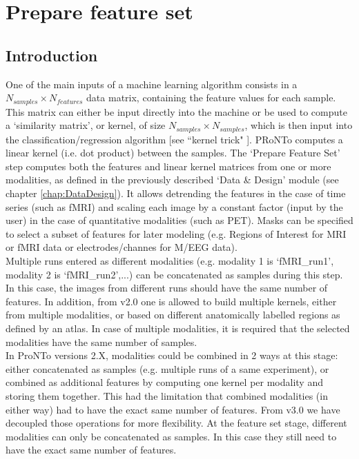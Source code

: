 %

\chapter{Prepare feature set}
\label{chap:PrepFeat}
\minitoc

\section{Introduction}
\label{sec:prep_intro}
One of the main inputs of a machine learning algorithm consists in a $N_{samples} \times N_{features}$ data matrix, containing the feature values for each sample.  This matrix can either be input directly into the machine or be used to compute a `similarity matrix', or kernel, of size $N_{samples} \times N_{samples}$, which is then input into the classification/regression algorithm [see ``kernel trick" \cite{Hofmann2008,Aizerman1964}]. PRoNTo computes a linear kernel (i.e. dot product) between the samples. The `Prepare Feature Set' step computes both the features and linear kernel matrices from one or more modalities, as defined in the previously described `Data \& Design' module (see chapter \ref{chap:DataDesign}).  It allows detrending the features in the case of time series (such as fMRI) and scaling each image by a constant factor (input by the user) in the case of quantitative modalities (such as PET). Masks can be specified to select a subset of features for later modeling (e.g. Regions of Interest for MRI or fMRI data or electrodes/channes for M/EEG data).
\\

Multiple runs entered as different modalities (e.g. modality 1 is `fMRI\_run1', modality 2 is `fMRI\_run2',...) can be concatenated as samples during this step. In this case, the images from different runs should have the same number of features. In addition, from v2.0 one is allowed to build multiple kernels, either from multiple modalities, or based on different anatomically labelled regions as defined by an atlas. In case of multiple modalities, it is required that the selected modalities have the same number of samples.
\\

In ProNTo versions 2.X, modalities could be combined in 2 ways at this stage: either concatenated as samples (e.g. multiple runs of a same experiment), or combined as additional features by computing one kernel per modality and storing them together. This had the limitation that combined modalities (in either way) had to have the exact same number of features. From v3.0 we have decoupled those operations for more flexibility. At the feature set stage, different modalities can only be concatenated as samples. In this case they still need to have the exact same number of features.
\\[1cm]







